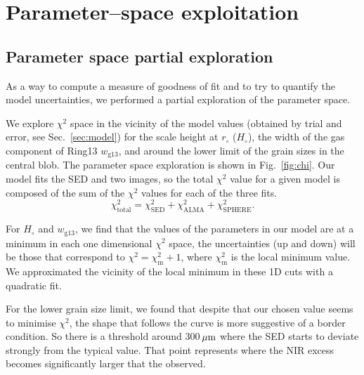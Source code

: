 \documentclass[fleqn,usenatbib,useAMS]{mnras}
\begin{document}

\appendix

\section{Parameter--space exploitation} \label{sec:Appendix}

\subsection{Parameter space partial exploration} \label{sec:A1}
As a way to compute a measure of goodness of fit and to try to quantify the model uncertainties, we performed a partial exploration of the parameter space. 

We explore $\chi^2$ space in the vicinity of the model values (obtained by trial and error, see Sec.~\ref{sec:model}) for the scale height at $r_\circ$ ($H_\circ$), the width of the gas component of Ring13 $w_{\mathrm{g13}}$, and around the lower limit of the grain sizes in the central blob. The parameter space exploration is shown in Fig.~\ref{fig:chi}. Our model fits the SED and two images, so the total $\chi^2$ value for a given model is composed of the sum of the $\chi^2$ values for each of the three fits.
\begin{equation}
    \chi^2_{\mathrm{total}}=\chi^2_{\mathrm{SED}}+\chi^2_{\mathrm{ALMA}}+\chi^2_{\mathrm{SPHERE}}.
\end{equation}

For $H_\circ$ and $w_{\mathrm{g13}}$, we find that the values of the parameters in our model are at a minimum in each one dimensional $\chi^2$ space, the uncertainties (up and down) will be those that correspond to $\chi^2=\chi^2_\mathrm{m}+1$, where $\chi^2_\mathrm{m}$ is the local minimum value. We approximated the vicinity of the local minimum in these 1D cuts with a quadratic fit.

For the lower grain size limit, we found that despite that our chosen value seems to minimise $\chi^2$, the shape that follows the curve is more suggestive of a border condition. So there is a threshold around 300\,$\hbox{$\mu$m}$ where the SED starts to deviate strongly from the typical value. That point represents where the NIR excess becomes significantly larger that the observed.
\end{document}
